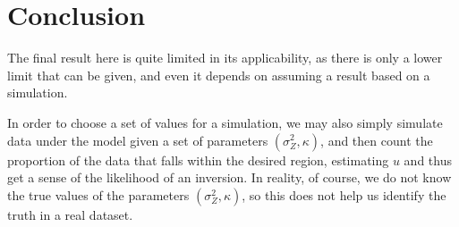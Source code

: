 \documentclass[12pt,a4paper]{article}\usepackage[]{graphicx}\usepackage[]{color}
\begin{document}
\section{Conclusion}

The final result here is quite limited in its applicability, as there is only a lower limit that can be given, and even it depends on assuming a result based on a simulation.

In order to choose a set of values for a simulation, we may also simply simulate data under the model given a set of parameters $(\sigma^2_Z, \kappa)$, and then count the proportion of the data that falls within the desired region, estimating $u$ and thus get a sense of the likelihood of an inversion. In reality, of course, we do not know the true values of the parameters $(\sigma^2_Z, \kappa)$, so this does not help us identify the truth in a real dataset.



\end{document}
